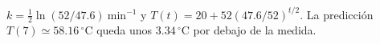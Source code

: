 $k=\tfrac12\ln(52/47.6)\ \mathrm{min}^{-1}$ y $T(t)=20+52(47.6/52)^{t/2}$. La predicción $T(7)\simeq58.16\,{}^\circ\mathrm C$ queda unos $3.34\,{}^\circ\mathrm C$ por debajo de la medida.
